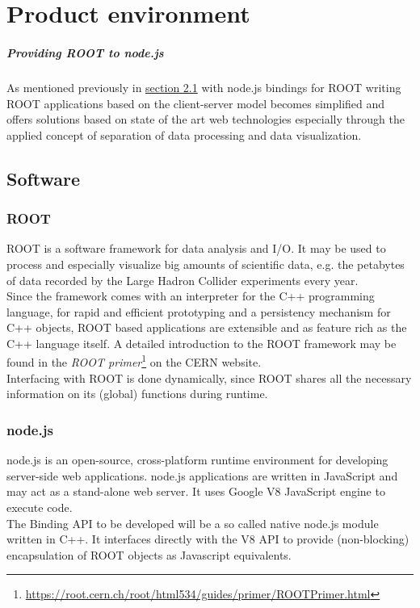 \chapter{Product environment}

\paragraph{Providing ROOT to node.js}
As mentioned previously in \hyperlink{section.2.1}{section 2.1} with node.js bindings for ROOT writing ROOT applications based on the client-server model becomes simplified and offers solutions based on state of the art web technologies especially through the applied concept of separation of data processing and data visualization.

\section{Software}
\subsection{ROOT}
ROOT is a software framework for data analysis and I/O. It may be used to process and especially visualize big amounts of scientific data, e.g. the petabytes of data recorded by the Large Hadron Collider experiments every year.\\
Since the framework comes with an interpreter for the C++ programming language, for rapid and efficient prototyping and a persistency mechanism for C++ objects, ROOT based applications are  extensible and as feature rich as the C++ language itself.
A detailed introduction to the ROOT framework may be found in the \textit{ROOT  primer}\footnote[1]{\url{https://root.cern.ch/root/html534/guides/primer/ROOTPrimer.html}}
on the CERN website.\\
Interfacing with ROOT is done dynamically, since ROOT shares all the necessary information on its (global) functions during runtime.

\subsection{node.js}
node.js is an open-source, cross-platform runtime environment for developing server-side web applications. node.js applications are written in JavaScript and may act as a stand-alone web server. It uses Google V8 JavaScript engine to execute code.\\
The Binding API to be developed will be a so called native node.js module written in C++. It interfaces directly with the V8 API to provide (non-blocking) encapsulation of ROOT objects as Javascript equivalents.

